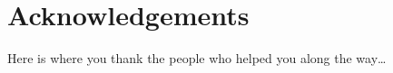 
\chapter*{Acknowledgements}
\label{cha:ack}

Here is where you thank the people who helped you along the way\dots


